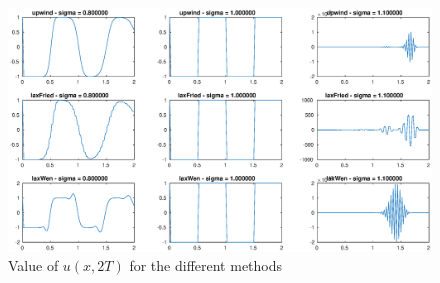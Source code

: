 \begin{figure}[!h]
\centering
\includegraphics[scale = 0.5]{./fig1.eps}
\caption{Value of $u(x,2T)$ for the different methods}
\label{fig:1}
\end{figure}
\FloatBarrier